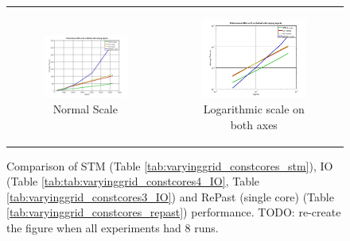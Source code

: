 \begin{figure}
\begin{center}
	\begin{tabular}{c c}
		\begin{subfigure}[b]{0.5\textwidth}
			\centering
			\includegraphics[width=1\textwidth, angle=0]{./fig/stm_io_repast_varyinggrid_performance.png}
			\caption{Normal Scale}
		\end{subfigure}
    	&
		\begin{subfigure}[b]{0.5\textwidth}
			\centering
			\includegraphics[width=1\textwidth, angle=0]{./fig/stm_io_repast_varyinggrid_performance_loglog.png}
			\caption{Logarithmic scale on both axes}
		\end{subfigure}
    \end{tabular}
	\caption{Comparison of STM (Table \ref{tab:varyinggrid_constcores_stm}), IO (Table \ref{tab:tab:varyinggrid_constcores4_IO}, Table 					\ref{tab:varyinggrid_constcores3_IO}) and RePast (single core) (Table \ref{tab:varyinggrid_constcores_repast}) performance. TODO: re-create the figure when all experiments had 8 runs.}
	\label{fig:stm_io_repast_varyinggrid_performance}
\end{center}
\end{figure}

